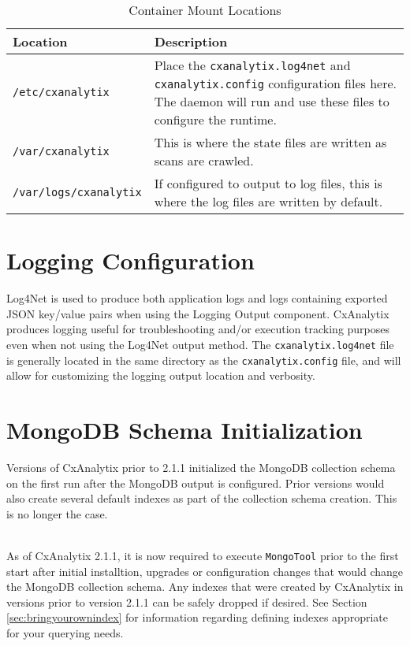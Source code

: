 \begin{table}
    \centering
    \begin{tabular}{|l|l|}
        \toprule
        \textbf{Location} & \textbf{Description}\\
        \midrule
        \verb|/etc/cxanalytix| & \makecell[l]{Place the \texttt{cxanalytix.log4net} and \texttt{cxanalytix.config} configuration files here.
        \\The daemon will run and use these files to configure the runtime.}\\
        \midrule
        \verb|/var/cxanalytix| & This is where the state files are written as scans are crawled.\\
        \midrule
        \verb|/var/logs/cxanalytix| & If configured to output to log files, this is where the log files are written by default.\\
        \bottomrule
    \end{tabular}
    \caption{Container Mount Locations}
    \label{tab:mounts}
\end{table}


\section{Logging Configuration}

Log4Net is used to produce both application logs and logs containing exported JSON key/value pairs when using the Logging Output component. 
CxAnalytix produces logging useful for troubleshooting and/or execution tracking purposes even when not using the Log4Net output method.  The 
\texttt{cxanalytix.log4net} file is generally located in the same directory as the \texttt{cxanalytix.config} file, and will allow for
customizing the logging output location and verbosity.

\section{MongoDB Schema Initialization}\label{sec:mongotool}

Versions of CxAnalytix prior to 2.1.1 initialized the MongoDB collection schema on the first run after the MongoDB output is configured. Prior 
versions would also create several default indexes as part of the collection schema creation. This is no longer the case.

\noindent\\As of CxAnalytix 2.1.1, it is now required to execute \texttt{MongoTool} prior to the first start after initial installtion, 
upgrades or configuration changes that would change the MongoDB collection schema.  Any indexes that were created by CxAnalytix in versions 
prior to version 2.1.1 can be safely dropped if desired.  See Section \ref{sec:bringyourownindex} for information regarding defining indexes
appropriate for your querying needs.

